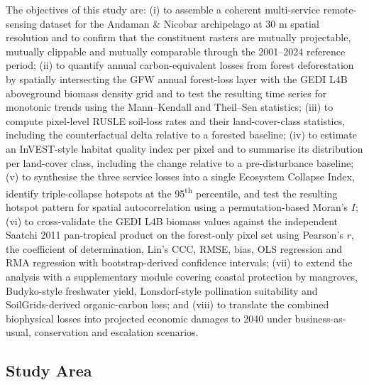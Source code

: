 \documentclass[12pt,a4paper]{article}
\begin{document}
The objectives of this study are: (i) to assemble a coherent
multi-service remote-sensing dataset for the Andaman \& Nicobar
archipelago at 30 m spatial resolution and to confirm that the
constituent rasters are mutually projectable, mutually clippable and
mutually comparable through the 2001--2024 reference period; (ii) to
quantify annual carbon-equivalent losses from forest deforestation by
spatially intersecting the GFW annual forest-loss layer with the GEDI
L4B aboveground biomass density grid and to test the resulting time
series for monotonic trends using the Mann--Kendall and Theil--Sen
statistics; (iii) to compute pixel-level RUSLE soil-loss rates and
their land-cover-class statistics, including the counterfactual delta
relative to a forested baseline; (iv) to estimate an InVEST-style
habitat quality index per pixel and to summarise its distribution per
land-cover class, including the change relative to a pre-disturbance
baseline; (v) to synthesise the three service losses into a single
Ecosystem Collapse Index, identify triple-collapse hotspots at the
95\textsuperscript{th} percentile, and test the resulting hotspot
pattern for spatial autocorrelation using a permutation-based Moran's
$I$; (vi) to cross-validate the GEDI L4B biomass values against the
independent Saatchi 2011 pan-tropical product on the forest-only
pixel set using Pearson's $r$, the coefficient of determination,
Lin's CCC, RMSE, bias, OLS regression and RMA regression with
bootstrap-derived confidence intervals; (vii) to extend the analysis
with a supplementary module covering coastal protection by
mangroves, Budyko-style freshwater yield, Lonsdorf-style pollination
suitability and SoilGrids-derived organic-carbon loss; and (viii) to
translate the combined biophysical losses into projected economic
damages to 2040 under business-as-usual, conservation and escalation
scenarios.

\subsection{Study Area}
\end{document}

